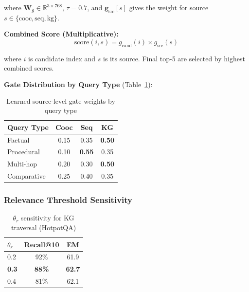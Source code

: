 \documentclass[10pt,twocolumn]{article}
\begin{document}
where $\mathbf{W}_g \in \mathbb{R}^{3 \times 768}$, $\tau=0.7$, and $\mathbf{g}_{\text{src}}[s]$ gives the weight for source $s \in \{\text{cooc}, \text{seq}, \text{kg}\}$.

\textbf{Combined Score (Multiplicative):}
\begin{equation}
\text{score}(i, s) = g_{\text{cand}}(i) \times g_{\text{src}}(s)
\label{eq:combined_score}
\end{equation}

where $i$ is candidate index and $s$ is its source. Final top-5 are selected by highest combined scores.

\textbf{Gate Distribution by Query Type} (Table~\ref{tab:gate_distribution}):

\begin{table}[h]
\centering
\caption{Learned source-level gate weights by query type}
\label{tab:gate_distribution}
\small
\begin{tabular}{@{}lccc@{}}
\toprule
\textbf{Query Type} & \textbf{Cooc} & \textbf{Seq} & \textbf{KG} \\
\midrule
Factual & 0.15 & 0.35 & \textbf{0.50} \\
Procedural & 0.10 & \textbf{0.55} & 0.35 \\
Multi-hop & 0.20 & 0.30 & \textbf{0.50} \\
Comparative & 0.25 & 0.40 & 0.35 \\
\bottomrule
\end{tabular}
\end{table}


\subsubsection{Relevance Threshold Sensitivity}
\label{sec:theta_sensitivity}

\begin{table}[h]
\centering
\caption{$\theta_r$ sensitivity for KG traversal (HotpotQA)}
\label{tab:theta}
\small
\begin{tabular}{@{}lcc@{}}
\toprule
$\theta_r$ & \textbf{Recall@10} & \textbf{EM} \\
\midrule
0.2 & 92\% & 61.9 \\
\textbf{0.3} & \textbf{88\%} & \textbf{62.7} \\
0.4 & 81\% & 62.1 \\
\bottomrule
\end{tabular}
\end{table}


\end{document}
